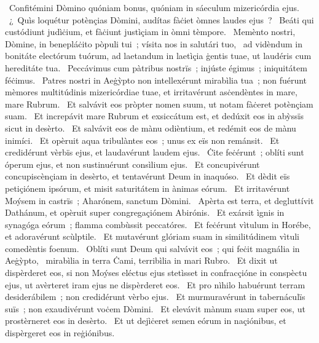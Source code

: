 \psalmChapterWithInscription{}
{ }
{%
~Confitémini Dòmino quóniam bonus, quóniam in sáeculum mizericórdia ejus. 
~¿~Quìs loquétur potènçias Dòmini, audítas fàċiet òmnes laudes ejus~? 
~Beáti qui custódiunt judìċium, et fàċiunt justìçiam in òmni tèmpore. 
~Memènto nostri, Dòmine, in benepláċito pòpuli tui~; vísita nos in salutári tuo, 
~ad vidèndum in bonitáte electórum tuórum, ad laetandum in laetìçia ġentis tuae, ut laudéris cum hereditáte tua. 
~Peccávimus cum pàtribus nostrïs~; injúste égimus~; iniquitátem féċimus. 
~Patres nostri in Aeġỳpto non intellexérunt mirabìlia tua~; non fuérunt mèmores multitúdinis mizericórdiae tuae, et irritavérunt asċendèntes in mare, mare Rubrum. 
~Et salvávit eos pròpter nomen suum, ut notam fàċeret potènçiam suam. 
~Et increpávit mare Rubrum et exsiccátum est, et dedúxit eos in abỳssïs sicut in desèrto. 
~Et salvávit eos de mànu odièntium, et redémit eos de mànu inimíci. 
~Et opèruit aqua tribulàntes eos~; unus ex eïs non remánsit. 
~Et credidérunt vèrbïs ejus, et laudavérunt laudem ejus. 
~Ċite feċérunt~; oblíti sunt óperum ejus, et non sustinuérunt consìlium ejus. 
~Et concupivérunt concupiscènçiam in desèrto, et tentavérunt Deum in inaquóso. 
~Et dèdit eïs petiçiónem ipsórum, et misit saturitátem in ànimas eórum. 
~Et irritavérunt Moýsem in castrïs~; Aharónem, sanctum Dòmini. 
~Apèrta est terra, et degluttívit Dathánum, et opèruit super congregaçiónem Abirónis. 
~Et exársit ìgnis in synagóga eórum~; flamma combùssit peccatóres. 
~Et feċérunt vìtulum in Horébe, et adoravérunt scùlptile. 
~Et mutavérunt glóriam suam in similitúdinem vìtuli comedèntis foenum. 
~Oblíti sunt Deum qui salvávit eos~; qui feċit magnália in Aeġỳpto, 
~mirabìlia in terra Ċami, terribìlia in mari Rubro. 
~Et dixit ut dispèrderet eos, si non Moýses eléctus ejus stetìsset in confracçióne in conspèctu ejus, ut avèrteret iram ejus ne dispèrderet eos. 
~Et pro nìhilo habuérunt terram desiderábilem~; non credidérunt vèrbo ejus. 
~Et murmuravérunt in tabernáculïs suïs~; non exaudivérunt voċem Dòmini. 
~Et elevávit mànum suam super eos, ut prostèrneret eos in desèrto. 
~Et ut dejìċeret semen eórum in naçiónibus, et dispèrgeret eos in reġiónibus. 
}
